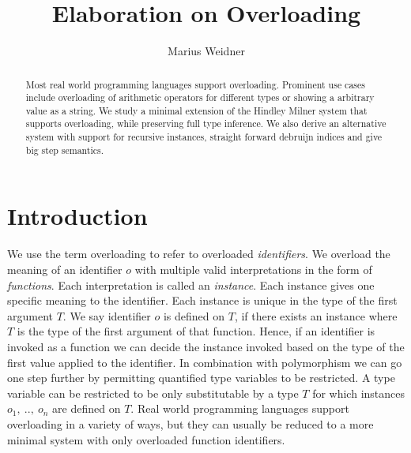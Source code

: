\documentclass[runningheads]{llncs}
\begin{document}
\title{Elaboration on Overloading}
\author{Marius Weidner \\ }
\maketitle

\begin{abstract}
Most real world programming languages support overloading. 
Prominent use cases include overloading of arithmetic operators for different types or showing a arbitrary value as a string. 
We study a minimal extension of the Hindley Milner system that supports overloading, while preserving full type inference. 
We also derive an alternative system with support for recursive instances, straight forward debruijn indices and give big step semantics.
\end{abstract}

\section{Introduction}
We use the term overloading to refer to overloaded \emph{identifiers}.
We overload the meaning of an identifier $o$ with multiple valid interpretations in the form of \emph{functions}. 
Each interpretation is called an \emph{instance}.
Each instance gives one specific meaning to the identifier. 
Each instance is unique in the type of the first argument $T$. 
We say identifier $o$ is defined on $T$, if there exists an instance where $T$ is the type of the first argument of that function.
Hence, if an identifier is invoked as a function we can decide the instance invoked based on the type of the first value applied to the identifier. 
In combination with polymorphism we can go one step further by permitting quantified type variables to be restricted. 
A type variable can be restricted to be only substitutable by a type $T$ for which instances $o_1, \ .., \ o_n$ are defined on $T$.
Real world programming languages support overloading in a variety of ways, but they can usually be reduced to a more minimal system with only overloaded function identifiers. 
\end{document}
